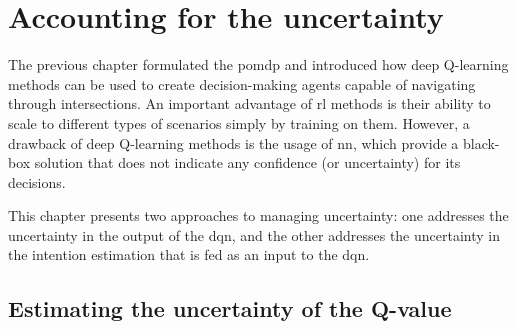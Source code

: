 \chapter{Accounting for the uncertainty}\label{ch:uncertainty}

The previous chapter formulated the \gls{pomdp} and introduced how deep Q-learning methods can be used to create decision-making agents capable of navigating through intersections. An important advantage of \gls{rl} methods is their ability to scale to different types of scenarios simply by training on them. However, a drawback of deep Q-learning methods is the usage of \gls{nn}, which provide a black-box solution that does not indicate any confidence (or uncertainty) for its decisions. 

This chapter presents two approaches to managing uncertainty: one addresses the uncertainty in the output of the \gls{dqn}, and the other addresses the uncertainty in the intention estimation that is fed as an input to the \gls{dqn}.

\section{Estimating the uncertainty of the Q-value}


